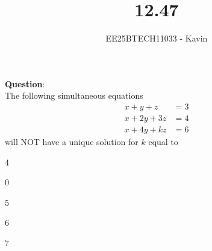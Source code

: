 \documentclass[journal]{IEEEtran}
\begin{document}

\vspace{3cm}

\title{12.47}
\author{EE25BTECH11033 - Kavin}
{\let\newpage\relax\maketitle}

\renewcommand{\thefigure}{\theenumi}
\renewcommand{\thetable}{\theenumi}
\setlength{\intextsep}{10pt} %
\textbf{Question}:\\
The following simultaneous equations
\begin{align*}
x + y + z &= 3 \\
x + 2y + 3z &= 4 \\
x + 4y + kz &= 6
\end{align*}
will NOT have a unique solution for $k$ equal to 
\begin{enumerate}
\begin{multicols}{4}
\item $0$
\item $5$
\item $6$
\item $7$
\end{multicols}
\end{enumerate}\\    
\bigskip
\end{document}
